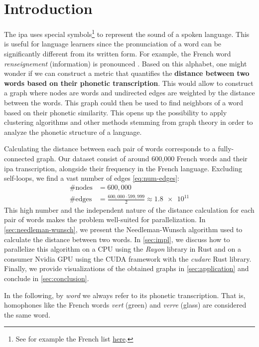 \section{Introduction}

The \gls{ipa} uses special symbols\footnote{See for example the French list \href{https://en.wikipedia.org/wiki/Help:IPA/French}{here}.} to represent the sound of a spoken language. This is useful for language learners since the pronunciation of a word can be significantly different from its written form. For example, the French word \textit{renseignement} (information) is pronounced . Based on this alphabet, one might wonder if we can construct a metric that quantifies the \textbf{distance between two words based on their phonetic transcription}. This would allow to construct a graph where nodes are words and undirected edges are weighted by the distance between the words. This graph could then be used to find neighbors of a word based on their phonetic similarity. This opens up the possibility to apply clustering algorithms and other methods stemming from graph theory in order to analyze the phonetic structure of a language.

Calculating the distance between each pair of words corresponds to a fully-connected graph. Our dataset consist of around 600,000 French words and their \gls{ipa} transcription, alongside their frequency in the French language. Excluding self-loops, we find a vast number of edges \eqref{eq:num-edges}:
\begin{align}
    \text{\#nodes} &= 600,000 \\
    \text{\#edges} &= \frac{600,000 \cdot 599,999}{2} \approx \num{1.8e11}
\end{align}
This high number and the independent nature of the distance calculation for each pair of words makes the problem well-suited for parallelization. In \autoref{sec:needleman-wunsch}, we present the Needleman-Wunsch algorithm used to calculate the distance between two words. In \autoref{sec:impl}, we discuss how to parallelize this algorithm on a CPU using the \textit{Rayon} library in Rust and on a consumer Nvidia GPU using the CUDA framework with the \textit{cudarc} Rust library. Finally, we provide visualizations of the obtained graphs in \ref{sec:application} and conclude in \autoref{sec:conclusion}.

In the following, by \textit{word} we always refer to its phonetic transcription. That is, homophones like the French words \textit{vert}  (green) and \textit{verre}  (glass) are considered the same word.

